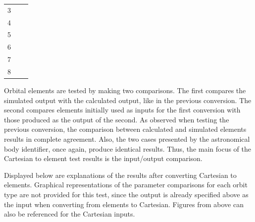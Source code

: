 \begin{itemize}
\begin{table}[H]
\begin{tabular}{c|c|c}
		3 &       	   &\\	
		4 &       	   &\\
		5 &       	   &\\
		6 &       	   &\\
		7 &       	   &\\
		8 &       	   &\\
		\hline
	\end{tabular}
\end{table}
	Orbital elements are tested by making two comparisons. The first compares the simulated output with the calculated output, like in the previous conversion. The second compares elements initially used as inputs for the first conversion with those produced as the output of the second. As observed when testing the previous conversion, the comparison between calculated and simulated elements results in complete agreement. Also, the two cases presented by the astronomical body identifier, once again, produce identical results. Thus, the main focus of the Cartesian to element test results is the input/output comparison.
	
	Displayed below are explanations of the results after converting Cartesian to elements. Graphical representations of the parameter comparisons for each orbit type are not provided for this test, since the output is already specified above as the input when converting from elements to Cartesian. Figures from above can also be referenced for the Cartesian inputs. 
	

\end{itemize}
